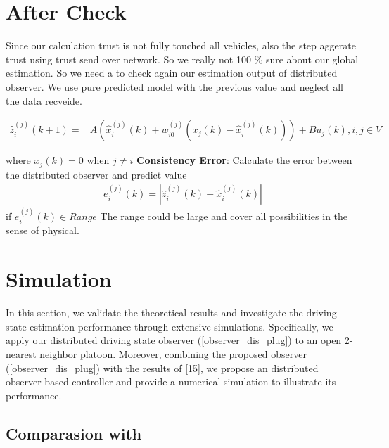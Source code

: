 \documentclass[letterpaper, 10pt, conference]{ieeeconf}  %
\def\eqref#1{(\ref{#1})}
\begin{document}


\section{After Check}
Since our calculation trust is not fully touched all vehicles, also the step aggerate trust using trust send over network. So we really not 100 $ \% $ sure about our global estimation. So we need a to check again our estimation output of distributed observer. We use pure predicted model with the previous value and neglect all the data recveide. 

\begin{equation}\label{dis_obs_predic}
\begin{aligned}
\hat{{z}}_i^{(j)}(k+1)= & A\left(\hat{x}_i^{(j)}(k)+w_{i 0}^{(j)}\left(\bar{x}_j(k)-\hat{x}_i^{(j)}(k)\right)\right)+B u_j(k), i, j \in V
\end{aligned}
\end{equation}

where $\bar{x}_j(k) = 0$ when $j \neq i$ 
\textbf{Consistency Error}: Calculate the error between the distributed observer and predict value 
    \begin{align}
    e_{i}^{(j)}(k) = \left| \hat{z}_i^{(j)}(k) - \hat{x}_i^{(j)}(k) \right| \end{align}
if  $e_{i}^{(j)}(k) \in Range$
The range could be large and cover all possibilities in the sense of physical.
\section{Simulation}



In this section, we validate the theoretical results and investigate the driving state estimation performance through extensive
simulations. Specifically, we apply our distributed driving state
observer \eqref{observer_dis_plug} to an open 2-nearest neighbor platoon. Moreover,
combining the proposed observer \eqref{observer_dis_plug} with the results of [15], we
propose an distributed observer-based controller and provide a
numerical simulation to illustrate its performance.

\subsection{Comparasion with \cite{Plug_play}}
\end{document}

